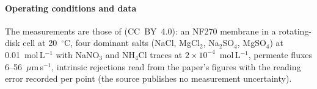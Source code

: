 \documentclass[preprint,12pt]{elsarticle}
\begin{document}
\paragraph{Operating conditions and data}  The measurements are those of
\citet{fdl2021} (CC~BY~4.0): an NF270 membrane in a rotating-disk cell at
20~$^\circ$C, four dominant salts (NaCl, MgCl$_2$, Na$_2$SO$_4$,
MgSO$_4$) at 0.01~mol\,L$^{-1}$ with NaNO$_3$ and NH$_4$Cl traces at
$2\times10^{-4}$~mol\,L$^{-1}$, permeate fluxes 6--56~$\mu$m\,s$^{-1}$,
intrinsic rejections read from the paper's figures with the reading error
recorded per point (the source publishes no measurement uncertainty).
\end{document}
